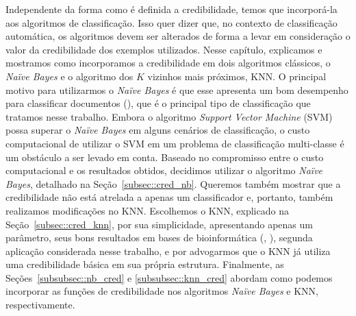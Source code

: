Independente da forma como é definida a credibilidade, temos que incorporá-la aos algoritmos de classificação. Isso quer dizer que, no contexto de classificação automática, os algoritmos devem ser alterados de forma a levar em consideração o valor da credibilidade dos exemplos utilizados. Nesse capítulo, explicamos e mostramos como incorporamos a credibilidade em dois algoritmos clássicos, o \textit{Naïve Bayes} e o algoritmo dos $K$ vizinhos mais próximos, \textsc{KNN}. O principal motivo para utilizarmos o \textit{Naïve Bayes} é que esse apresenta um bom desempenho  para classificar documentos (\cite{Salles10}), que é o principal tipo de classificação que tratamos nesse trabalho. Embora o algoritmo \textit{Support Vector Machine} (\textsc{SVM}) possa superar o \textit{Naïve Bayes} em alguns cenários de classificação, o custo computacional de utilizar o \textsc{SVM} em um problema de classificação multi-classe é um obstáculo a ser levado em conta. Baseado no compromisso entre o custo computacional e os resultados obtidos, decidimos utilizar o algoritmo \textit{Naïve Bayes}, detalhado na Seção~\ref{subsec::cred_nb}. Queremos também mostrar que a credibilidade não está atrelada a apenas um classificador e, portanto, também realizamos modificações no \textsc{KNN}. Escolhemos o \textsc{KNN}, explicado na Seção~\ref{subsec::cred_knn}, por sua simplicidade, apresentando apenas um parâmetro, seus bons resultados em bases de bioinformática (\cite{Li04}, \cite{Yeang01}), segunda aplicação considerada nesse trabalho, e por advogarmos que o \textsc{KNN} já utiliza uma credibilidade básica em sua própria estrutura. Finalmente, as Seções~\ref{subsubsec::nb_cred} e \ref{subsubsec::knn_cred} abordam como podemos incorporar as funções de credibilidade nos algoritmos \textit{Naïve Bayes} e \textsc{KNN}, respectivamente.








